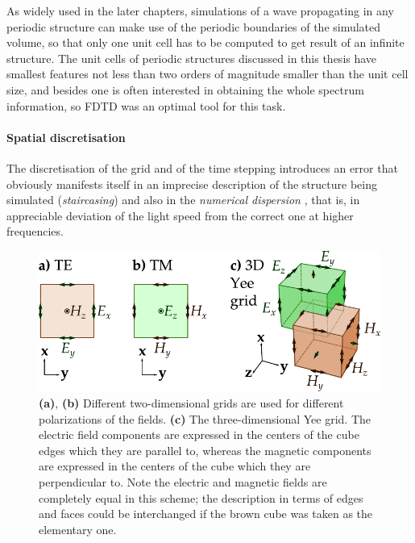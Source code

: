 As widely used in the later chapters,  %
simulations of a wave propagating in any periodic structure can make use of the periodic boundaries of the simulated volume, so that only one unit cell has to be computed to get result of an infinite structure. The unit cells of periodic structures discussed in this thesis have smallest features not less than two orders of magnitude smaller than the unit cell size, and besides one is often interested in obtaining the whole spectrum information, so FDTD was an optimal tool for this task.
\paragraph{Spatial discretisation} %
The discretisation of the grid and of the time stepping introduces an error that obviously manifests itself in an imprecise description of the structure being simulated (\textit{staircasing}) and also in the \textit{numerical dispersion} \cite{taflove2005book}, that is, in appreciable deviation of the light speed from the correct one at higher frequencies.  %
\begin{figure}[ht] \caption{\textbf{(a)}, \textbf{(b)} Different two-dimensional grids are used for different polarizations of the fields. \textbf{(c)} The three-dimensional Yee grid. The electric field components are expressed in the centers of the cube edges which they are parallel to, whereas the magnetic components are expressed in the centers of the cube which they are perpendicular to. Note the electric and magnetic fields are completely equal in this scheme; the description in terms of edges and faces could be interchanged if the brown cube was taken as the elementary one.} \label{fg_fdtd_yee} \centering 
	\includegraphics[width=12cm]{img/FDTD_Yee_grid_2d-3d.pdf}
\end{figure}

